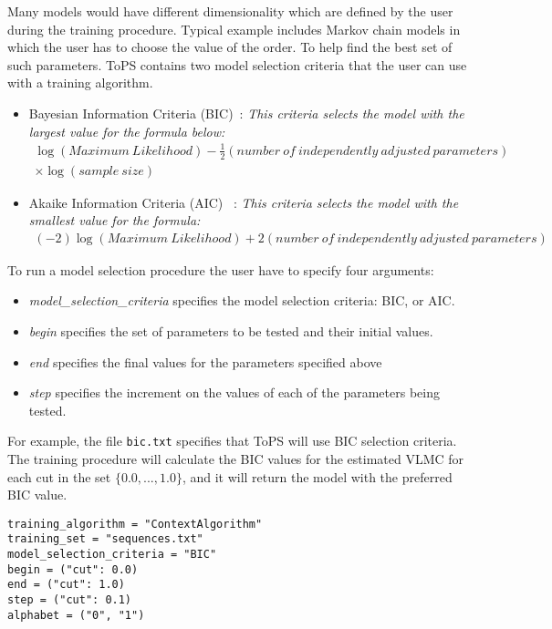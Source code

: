 Many models would have different dimensionality which are defined by the user during the training procedure. Typical example includes Markov chain models in which the user has to choose the value of the order. To help find the best set of such parameters. ToPS contains two model selection criteria that the user can use with a training algorithm.

\vspace{1em}
\begin{minipage}{\textwidth}
\begin{itemize}
\item  Bayesian Information Criteria (BIC)~\cite{Schwarz1978}: \textit{This criteria selects the model with the largest value for the formula below:}
\begin{align*}
\log (Maximum~Likelihood) - \frac{1}{2} (number~of~independently~adjusted~parameters) \\ \times \log (sample~size)
\end{align*}
\vspace{1em}

\item Akaike Information Criteria (AIC) ~\cite{Akaike1974}: \textit{This criteria selects the model with the smallest value for the formula:}
\begin{align*}
(-2) \log (Maximum~Likelihood) + 2  (number~of~independently~adjusted~parameters)
\end{align*}
\end{itemize}
\end{minipage}
\vspace{1em}

To run a model selection procedure the user have to specify four arguments:

\begin{itemize}
\item \textit{model\_selection\_criteria} specifies the model selection criteria: BIC, or AIC.
\item \textit{begin} specifies the set of parameters to be tested and their initial values.
\item \textit{end} specifies  the final values for the parameters specified above
\item \textit{step} specifies the increment on the values of each of the parameters being tested.
\end{itemize}


For example, the file \texttt{bic.txt} specifies that ToPS will use BIC selection criteria. The training procedure will calculate the BIC values for the estimated VLMC for each  cut in the set $\{0.0,...,1.0\}$, and it will return the model with the preferred BIC value.


\vspace{1em}
\begin{minipage}{\textwidth}
\begin{Verbatim}[frame=single,  label={bic.txt}]
training_algorithm = "ContextAlgorithm"
training_set = "sequences.txt"
model_selection_criteria = "BIC"
begin = ("cut": 0.0)
end = ("cut": 1.0)
step = ("cut": 0.1)
alphabet = ("0", "1")
\end{Verbatim}
\end{minipage}
\vspace{1em}

